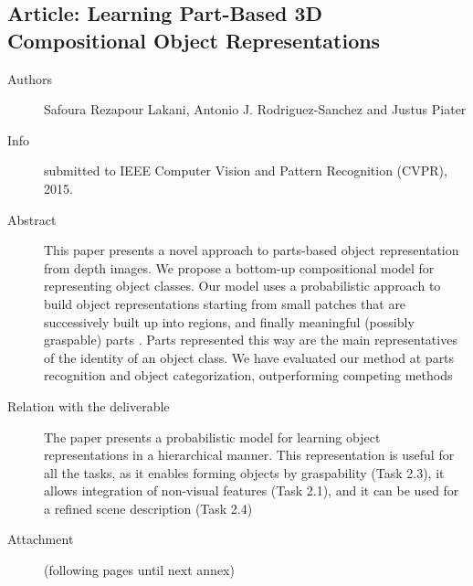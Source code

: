 \documentclass[a4paper,11pt,pdf]{pacmanreport}
\begin{document}
\subsection{Article: Learning Part-Based 3D Compositional Object Representations} \label{ann:cvpr}
\begin{description}
	\item[Authors] Safoura Rezapour Lakani, Antonio J. Rodriguez-Sanchez and Justus Piater
	\item[Info] submitted to IEEE Computer Vision and Pattern Recognition (CVPR), 2015.
	\item[Abstract] This paper presents a novel approach to parts-based object 
representation from depth images. We propose a bottom-up compositional model for 
representing object classes. Our model uses a probabilistic approach to build 
object representations starting from small patches that are successively built 
up into regions, and finally meaningful (possibly graspable) parts . Parts 
represented this way are the main representatives of the identity of an object 
class. We have evaluated our method at parts recognition and object 
categorization, outperforming competing methods
	\item[Relation with the deliverable] The paper presents a probabilistic model for learning object representations in a hierarchical manner. This representation is useful for all the tasks, as it 
enables forming objects by graspability (Task 2.3), it allows integration of 
non-visual features (Task 2.1), and it can be used for a refined scene 
description (Task 2.4)
    \item[Attachment] (following pages until next annex)
\end{description}

\end{document}

